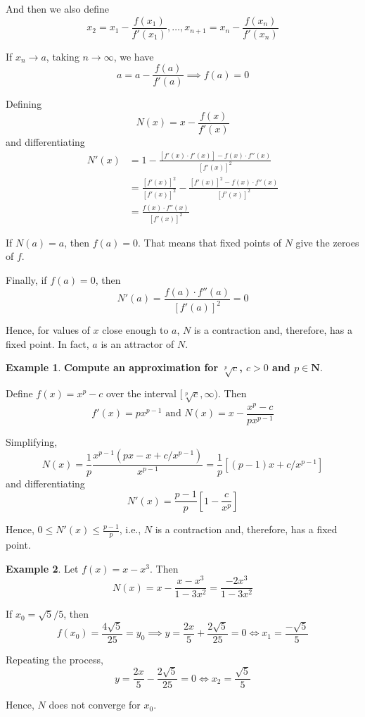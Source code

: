 \documentclass[tikz,12pt,a4paper]{article}
\theoremstyle{definition}
\newtheorem{example}{Example}[section]
\begin{document}
And then we also define
\[
	x_2 = x_1 - \frac{f(x_1)}{f'(x_1)}, \ldots, x_{n+1} = x_n - \frac{f(x_n)}{f'(x_n)}
\]

If $x_n \longrightarrow a$, taking $n \longrightarrow \infty$, we have
\[
	a = a - \frac{f(a)}{f'(a)} \implies f(a) = 0
\]

Defining
\[
	N(x) = x - \frac{f(x)}{f'(x)}
\]
and differentiating
\begin{equation*}
	\begin{aligned}
	N'(x) &= 1 - \frac{[f'(x)\cdot f'(x)] - f(x)\cdot f''(x)}{[f'(x)]^2} \\
	&= \frac{[f'(x)]^2}{[f'(x)]^2} - \frac{[f'(x)]^2 - f(x)\cdot f''(x)}{[f'(x)]^2} \\
	&= \frac{f(x)\cdot f''(x)}{[f'(x)]^2}
	\end{aligned}
\end{equation*}

If $N(a) = a$, then $f(a) = 0$. That means that fixed points of $N$ give the zeroes of $f$. 

Finally, if $f(a) = 0$, then
\[
	N'(a) = \frac{f(a) \cdot f''(a)}{[f'(a)]^2} = 0
\]

Hence, for values of $x$ close enough to $a$, $N$ is a contraction and, therefore, has a fixed point. In fact, $a$ is an attractor of $N$.

\begin{example}
	\textbf{Compute an approximation for $\sqrt[p]{c}$, $c > 0$ and $p \in \textbf{N}$}.

	Define $f(x) = x^p - c$ over the interval $[\sqrt[p]{c}, \infty)$. Then
	\[
		f'(x) = p x^{p-1} \text{ and } N(x) = x - \frac{x^p - c}{p x^{p-1}}
	\]

	Simplifying, 
	\[
		N(x) = \frac{1}{p} \frac{x^{p-1} (px - x + c/x^{p-1})}{x^{p-1}} = \frac{1}{p} [(p-1)x + c/x^{p-1}]
	\]
	and differentiating
	\[
		N'(x) = \frac{p-1}{p} \left[ 1 - \frac{c}{x^p}\right]
	\]

	Hence, $0 \leq N'(x) \leq \frac{p-1}{p}$, i.e., $N$ is a contraction and, therefore, has a fixed point.
\end{example}

\begin{example}
	Let $f(x) = x - x^3$. Then 
	\[
		N(x) = x - \frac{x - x^3}{1 - 3x^2} = \frac{-2x^3}{1-3x^2}
	\]

	If $x_0 = \sqrt{5}/5$, then
	\[
		f(x_0) = \frac{4 \sqrt{5}}{25} = y_0 \implies y = \frac{2x}{5} + \frac{2 \sqrt{5}}{25} = 0 \iff x_1 = \frac{-\sqrt{5}}{5}
	\]

	Repeating the process,
	\[
		y = \frac{2x}{5} - \frac{2 \sqrt{5}}{25} = 0 \iff x_2 = \frac{\sqrt{5}}{5}
	\]

	Hence, $N$ does not converge for $x_0$.
\end{example}
\end{document}
